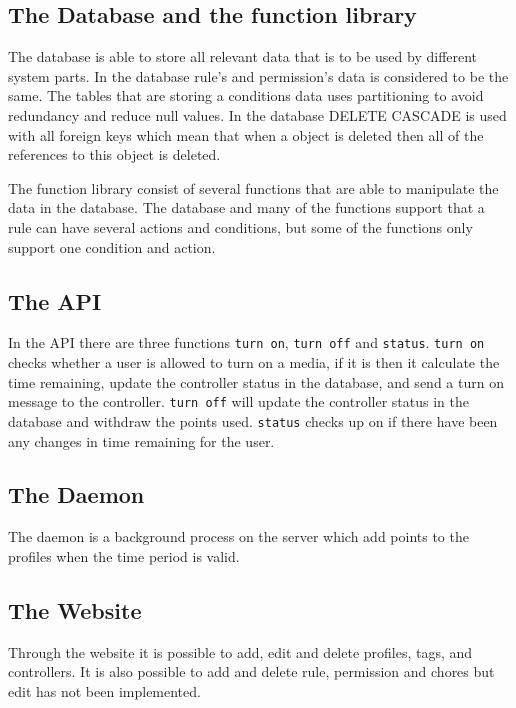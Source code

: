 \subsection*{The Database and the function library}
The database is able to store all relevant data that is to be used by different system parts. In the database rule's and permission's data is considered to be the same. The tables that are storing a conditions data uses partitioning to avoid redundancy and reduce null values. In the database DELETE CASCADE is used with all foreign keys which mean that when a object is deleted then all of the references to this object is deleted.

The function library consist of several functions that are able to manipulate the data in the database. The database and many of the functions support that a rule can have several actions and conditions, but some of the functions only support one condition and action.
 
\subsection*{The API}
In the API there are three functions \texttt{turn on}, \texttt{turn off} and \texttt{status}. \texttt{turn on} checks whether a user is allowed to turn on a media, if it is then it calculate the time remaining, update the controller status in the database, and send a turn on message to the controller. \texttt{turn off} will update the controller status in the database and withdraw the points used. \texttt{status} checks up on if there have been any changes in time remaining for the user.

\subsection*{The Daemon}
The daemon is a background process on the server which add points to the profiles when the time period is valid. 

\subsection*{The Website}
Through the website it is possible to add, edit and delete profiles, tags, and controllers. It is also possible to add and delete rule, permission and chores but edit has not been implemented. 

